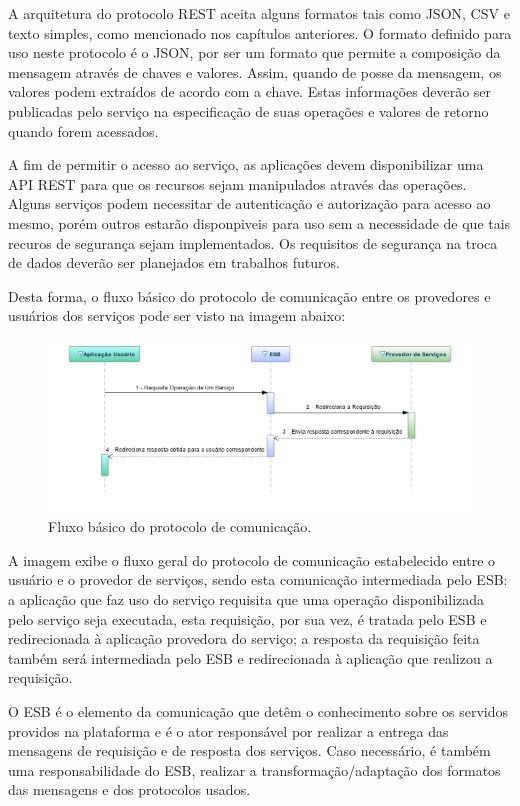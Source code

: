 A arquitetura do protocolo REST aceita alguns formatos tais como JSON, CSV e texto simples, como mencionado nos capítulos anteriores. O formato definido para uso neste protocolo é o JSON, por ser um formato que permite a composição da mensagem através de chaves e valores. Assim, quando de posse da mensagem, os valores podem extraídos de acordo com a chave. Estas informações deverão ser publicadas pelo serviço na especificação de suas operações e valores de retorno quando forem acessados.

A fim de permitir o acesso ao serviço, as aplicações devem disponibilizar uma API REST para que os recursos sejam manipulados através das operações. Alguns serviços podem necessitar de autenticação e autorização para acesso ao mesmo, porém outros estarão disponpiveis para uso sem a necessidade de que tais recuros de segurança sejam implementados. Os requisitos de segurança na troca de dados deverão ser planejados em trabalhos futuros.

Desta forma, o fluxo básico do protocolo de comunicação entre os provedores e usuários dos serviços pode ser visto na imagem abaixo: 

\begin{figure}[htb]
\centering
\includegraphics[width=1\textwidth]{figuras/fluxo_basico_protocolo.png}
\caption{Fluxo básico do protocolo de comunicação.}
\label{fluxo_basico_protocolo}
\end{figure}

A imagem exibe o fluxo geral do protocolo de comunicação estabelecido entre o usuário e o provedor de serviços, sendo esta comunicação intermediada pelo ESB: a aplicação que faz uso do serviço requisita que uma operação disponibilizada pelo serviço seja executada, esta requisição, por sua vez, é tratada pelo ESB e redirecionada à aplicação provedora do serviço; a resposta da requisição feita também será intermediada pelo ESB e redirecionada à aplicação que realizou a requisição.

O ESB é o elemento da comunicação que detêm o conhecimento sobre os servidos providos na plataforma e é o ator responsável por realizar a entrega das mensagens de requisição e de resposta dos serviços. Caso necessário, é também uma responsabilidade do ESB, realizar a transformação/adaptação dos formatos das mensagens e dos protocolos usados.

